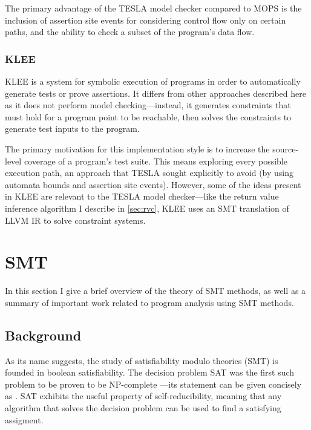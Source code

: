 The primary advantage of the TESLA model checker compared to MOPS is the
inclusion of assertion site events for considering control flow only on certain
paths, and the ability to check a subset of the program's data flow.

\subsubsection{KLEE}

KLEE \cite{cadar_klee:_2008} is a system for symbolic execution of programs in
order to automatically generate tests or prove assertions. It differs from other
approaches described here as it does not perform model checking---instead, it
generates constraints that must hold for a program point to be reachable, then
solves the constraints to generate test inputs to the program.

The primary motivation for this implementation style is to increase the
source-level coverage of a program's test suite. This means exploring every
possible execution path, an approach that TESLA sought explicitly to avoid (by
using automata bounds and assertion site events). However, some of the ideas
present in KLEE are relevant to the TESLA model checker---like the return value
inference algorithm I describe in \autoref{sec:rvc}, KLEE uses an SMT
translation of LLVM IR to solve constraint systems.

\section{SMT} \label{sec:smt}

In this section I give a brief overview of the theory of SMT methods, as well as
a summary of important work related to program analysis using SMT methods.

\subsection{Background}

As its name suggests, the study of satisfiability modulo theories (SMT) is
founded in boolean satisfiability. The decision problem SAT was the first such
problem to be proven to be NP-complete \cite{cook_complexity_1971}---its
statement can be given concisely as . SAT exhibits the useful property of self-reducibility,
meaning that any algorithm that solves the decision problem can be used to find
a satisfying assigment.

